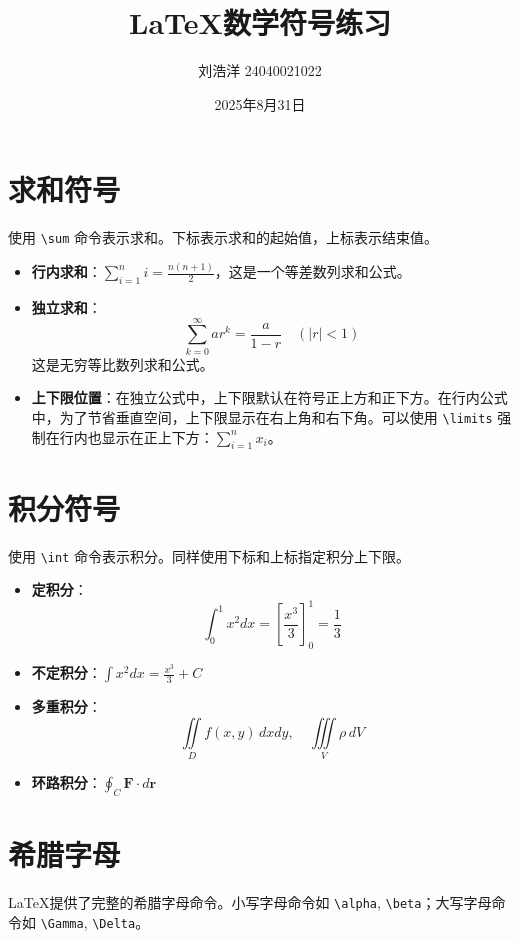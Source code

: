 \documentclass{article}
\title{LaTeX数学符号练习}
\author{刘浩洋 24040021022}
\date{2025年8月31日}
\begin{document}
\maketitle

\section{求和符号}
使用 \texttt{\textbackslash sum} 命令表示求和。下标表示求和的起始值，上标表示结束值。

\begin{itemize}
    \item \textbf{行内求和}：$ \sum_{i=1}^{n} i = \frac{n(n+1)}{2} $，这是一个等差数列求和公式。
    \item \textbf{独立求和}：
    \[
    \sum_{k=0}^{\infty} ar^k = \frac{a}{1-r} \quad (|r| < 1)
    \]
    这是无穷等比数列求和公式。
    \item \textbf{上下限位置}：在独立公式中，上下限默认在符号正上方和正下方。在行内公式中，为了节省垂直空间，上下限显示在右上角和右下角。可以使用 \texttt{\textbackslash limits} 强制在行内也显示在正上下方：$ \sum\limits_{i=1}^{n} x_i $。
\end{itemize}

\section{积分符号}
使用 \texttt{\textbackslash int} 命令表示积分。同样使用下标和上标指定积分上下限。

\begin{itemize}
    \item \textbf{定积分}：
    \[
    \int_{0}^{1} x^2 dx = \left[ \frac{x^3}{3} \right]_{0}^{1} = \frac{1}{3}
    \]
    \item \textbf{不定积分}：$ \int x^2 dx = \frac{x^3}{3} + C $
    \item \textbf{多重积分}：
    \[
    \iint\limits_{D} f(x,y) \, dxdy, \quad \iiint\limits_{V} \rho \, dV
    \]
    \item \textbf{环路积分}：$ \oint_C \mathbf{F} \cdot d\mathbf{r} $
\end{itemize}

\section{希腊字母}
LaTeX提供了完整的希腊字母命令。小写字母命令如 \texttt{\textbackslash alpha}, \texttt{\textbackslash beta}；大写字母命令如 \texttt{\textbackslash Gamma}, \texttt{\textbackslash Delta}。
\end{document}
